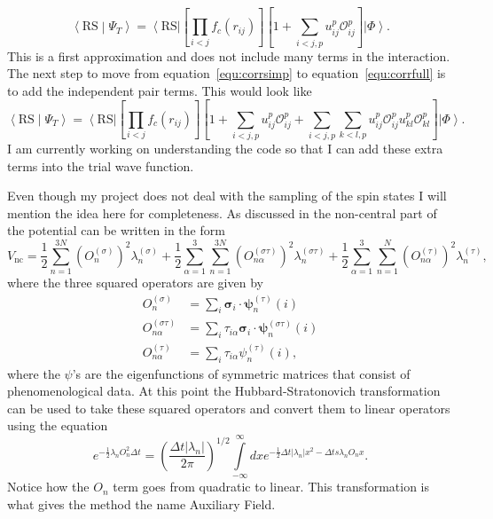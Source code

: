 \begin{equation}
  \left<\mathrm{RS}\middle|\Psi_T\right> = \left<\mathrm{RS}\right| \left[\prod\limits_{i<j}f_c(r_{ij})\right]\left[1+\sum\limits_{i<j,p}u_{ij}^p\mathcal{O}_{ij}^p\right] \left|\Phi\right>.
  \label{equ:corrsimp}
\end{equation}
This is a first approximation and does not include many terms in the interaction. The next step to move from equation~\ref{equ:corrsimp} to equation~\ref{equ:corrfull} is to add the independent pair terms. This would look like
\begin{equation}
  \left<\mathrm{RS}\middle|\Psi_T\right> = \left<\mathrm{RS}\right| \left[\prod\limits_{i<j}f_c(r_{ij})\right]\left[1+\sum\limits_{i<j,p}u_{ij}^p\mathcal{O}_{ij}^p + \sum\limits_{i<j,p}\sum\limits_{k<l,p}u_{ij}^p\mathcal{O}_{ij}^pu_{kl}^p\mathcal{O}_{kl}^p\right] \left|\Phi\right>. 
\end{equation}
I am currently working on understanding the code so that I can add these extra terms into the trial wave function.

Even though my project does not deal with the sampling of the spin states I will mention the idea here for completeness. As discussed in \cite{schmidt1999} the non-central part of the potential can be written in the form
\begin{equation}
  V_\mathrm{nc} = \frac{1}{2} \sum\limits_{n=1}^{3N}(O_n^{(\sigma)})^2\lambda_n^{(\sigma)} + \frac{1}{2} \sum\limits_{\alpha=1}^{3} \sum\limits_{n=1}^{3N}(O_{n\alpha}^{(\sigma\tau)})^2\lambda_n^{(\sigma\tau)} + \frac{1}{2} \sum\limits_{\alpha=1}^{3} \sum\limits_{n=1}^{N}(O_{n\alpha}^{(\tau)})^2\lambda_n^{(\tau)},
\end{equation}
where the three squared operators are given by
\begin{equation}
  \begin{split}
    O_n^{(\sigma)} &= \sum\limits_i \boldsymbol{\sigma}_i \cdot \boldsymbol{\psi}_n^{(\tau)}(i) \\
    O_{n\alpha}^{(\sigma\tau)} &= \sum\limits_i \tau_{i\alpha} \boldsymbol{\sigma}_i \cdot \boldsymbol{\psi}_n^{(\sigma\tau)}(i) \\
    O_{n\alpha}^{(\tau)} &= \sum\limits_i \tau_{i\alpha} \psi_n^{(\tau)}(i),
  \end{split}
\end{equation}
where the $\psi$'s are the eigenfunctions of symmetric matrices that consist of phenomenological data. At this point the Hubbard-Stratonovich transformation can be used to take these squared operators and convert them to linear operators using the equation
\begin{equation}
  e^{-\frac{1}{2}\lambda_n O_n^2\Delta t} = \left( \frac{\Delta t |\lambda_n|}{2\pi} \right)^{1/2} \int\limits_{-\infty}^{\infty} dx e^{-\frac{1}{2}\Delta t |\lambda_n|x^2 - \Delta t s \lambda_n O_n x}.
\end{equation}
Notice how the $O_n$ term goes from quadratic to linear. This transformation is what gives the method the name Auxiliary Field.
